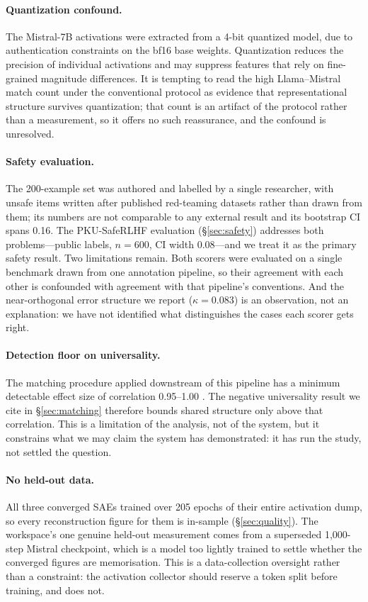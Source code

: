 \documentclass[11pt]{article}
\begin{document}
\paragraph{Quantization confound.} The Mistral-7B activations were extracted from a 4-bit quantized model, due to authentication constraints on the bf16 base weights. Quantization reduces the precision of individual activations and may suppress features that rely on fine-grained magnitude differences. It is tempting to read the high Llama--Mistral match count under the conventional protocol as evidence that representational structure survives quantization; that count is an artifact of the protocol rather than a measurement, so it offers no such reassurance, and the confound is unresolved.

\paragraph{Safety evaluation.} The 200-example set was authored and labelled by a single researcher, with unsafe items written after published red-teaming datasets rather than drawn from them; its numbers are not comparable to any external result and its bootstrap CI spans 0.16. The PKU-SafeRLHF evaluation (\S\ref{sec:safety}) addresses both problems---public labels, $n = 600$, CI width 0.08---and we treat it as the primary safety result. Two limitations remain. Both scorers were evaluated on a single benchmark drawn from one annotation pipeline, so their agreement with each other is confounded with agreement with that pipeline's conventions. And the near-orthogonal error structure we report ($\kappa = 0.083$) is an observation, not an explanation: we have not identified what distinguishes the cases each scorer gets right.

\paragraph{Detection floor on universality.} The matching procedure applied downstream of this pipeline has a minimum detectable effect size of correlation 0.95--1.00 \citep{melton2026saecomparison}. The negative universality result we cite in \S\ref{sec:matching} therefore bounds shared structure only above that correlation. This is a limitation of the analysis, not of the system, but it constrains what we may claim the system has demonstrated: it has run the study, not settled the question.

\paragraph{No held-out data.} All three converged SAEs trained over 205 epochs of their entire activation dump, so every reconstruction figure for them is in-sample (\S\ref{sec:quality}). The workspace's one genuine held-out measurement comes from a superseded 1,000-step Mistral checkpoint, which is a model too lightly trained to settle whether the converged figures are memorisation. This is a data-collection oversight rather than a constraint: the activation collector should reserve a token split before training, and does not.
\end{document}
